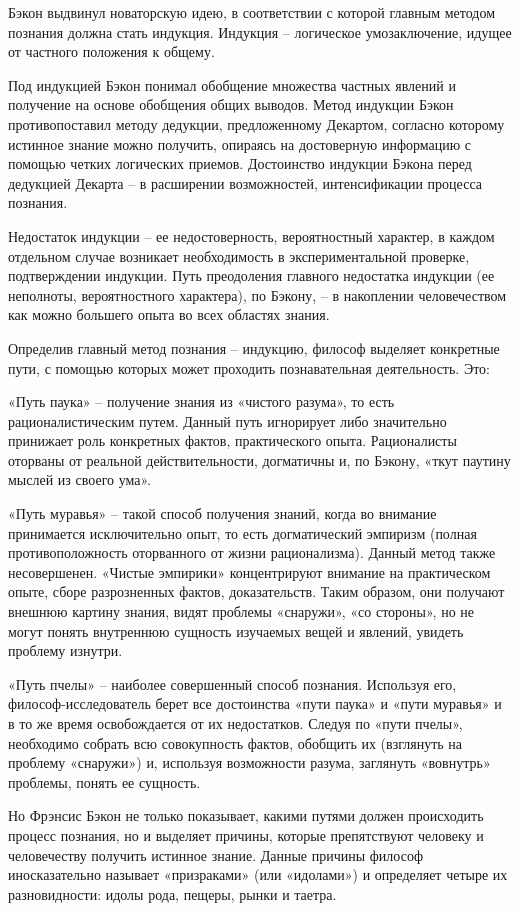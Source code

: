 \documentclass[a4paper, 14pt]{extreport}
\begin{document}
Бэкон выдвинул новаторскую идею, в соответствии с которой главным
методом познания должна стать индукция. Индукция -- логическое
умозаключение, идущее от частного положения к общему.

Под индукцией Бэкон понимал обобщение множества частных явлений и
получение на основе обобщения общих выводов. Метод индукции Бэкон
противопоставил методу дедукции, предложенному Декартом, согласно
которому истинное знание можно получить, опираясь на достоверную
информацию с помощью четких логических приемов. Достоинство индукции
Бэкона перед дедукцией Декарта -- в расширении возможностей,
интенсификации процесса познания.

Недостаток индукции -- ее недостоверность, вероятностный характер, в
каждом отдельном случае возникает необходимость в экспериментальной
проверке, подтверждении индукции. Путь преодоления главного недостатка
индукции (ее неполноты, вероятностного характера), по Бэкону, -- в
накоплении человечеством как можно большего опыта во всех областях
знания.

Определив главный метод познания -- индукцию, философ выделяет
конкретные пути, с помощью которых может проходить познавательная
деятельность. Это:

«Путь паука» -- получение знания из «чистого разума», то есть
рационалистическим путем. Данный путь игнорирует либо значительно
принижает роль конкретных фактов, практического опыта. Рационалисты
оторваны от реальной действительности, догматичны и, по Бэкону, «ткут
паутину мыслей из своего ума».

«Путь муравья» -- такой способ получения знаний, когда во внимание
принимается исключительно опыт, то есть догматический эмпиризм (полная
противоположность оторванного от жизни рационализма). Данный метод также
несовершенен. «Чистые эмпирики» концентрируют внимание на практическом
опыте, сборе разрозненных фактов, доказательств. Таким образом, они
получают внешнюю картину знания, видят проблемы «снаружи», «со стороны»,
но не могут понять внутреннюю сущность изучаемых вещей и явлений,
увидеть проблему изнутри.

«Путь пчелы» -- наиболее совершенный способ познания. Используя его,
философ-исследователь берет все достоинства «пути паука» и «пути
муравья» и в то же время освобождается от их недостатков. Следуя по
«пути пчелы», необходимо собрать всю совокупность фактов, обобщить их
(взглянуть на проблему «снаружи») и, используя возможности разума,
заглянуть «вовнутрь» проблемы, понять ее сущность.

Но Фрэнсис Бэкон не только показывает, какими путями должен происходить
процесс познания, но и выделяет причины, которые препятствуют человеку и
человечеству получить истинное знание. Данные причины философ
иносказательно называет «призраками» (или «идолами») и определяет четыре
их разновидности: идолы рода, пещеры, рынки и таетра.
\end{document}
